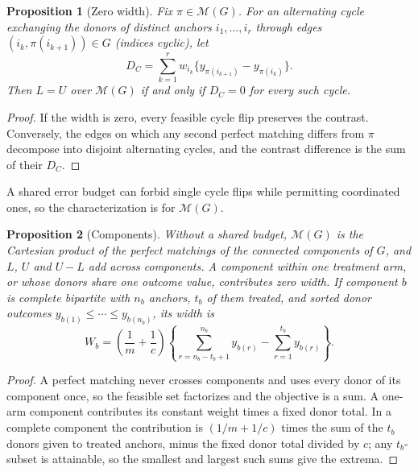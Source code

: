 \documentclass[11pt]{article}
\newtheorem{proposition}{Proposition}
\newcommand{\M}{\mathcal M}
\begin{document}
\begin{proposition}[Zero width]
Fix $\pi\in\M(G)$. For an alternating cycle exchanging the donors of distinct anchors
$i_1,\ldots,i_r$ through edges $(i_k,\pi(i_{k+1}))\in G$ (indices cyclic), let
\[
 D_C=\sum_{k=1}^r w_{i_k}\{y_{\pi(i_{k+1})}-y_{\pi(i_k)}\}.
\]
Then $L=U$ over $\M(G)$ if and only if $D_C=0$ for every such cycle.
\end{proposition}
\begin{proof}
If the width is zero, every feasible cycle flip preserves the contrast. Conversely, the
edges on which any second perfect matching differs from $\pi$ decompose into disjoint
alternating cycles, and the contrast difference is the sum of their $D_C$.
\end{proof}
A shared error budget can forbid single cycle flips while permitting coordinated ones,
so the characterization is for $\M(G)$.

\begin{proposition}[Components]
Without a shared budget, $\M(G)$ is the Cartesian product of the perfect matchings of
the connected components of $G$, and $L$, $U$ and $U-L$ add across components.
A component within one treatment arm, or whose donors share one outcome value,
contributes zero width. If component $b$ is complete bipartite with $n_b$ anchors,
$t_b$ of them treated, and sorted donor outcomes $y_{b(1)}\le\cdots\le y_{b(n_b)}$, its
width is
\[
 W_b=\left(\frac1m+\frac1c\right)\left\{\sum_{r=n_b-t_b+1}^{n_b}y_{b(r)}
 -\sum_{r=1}^{t_b}y_{b(r)}\right\}.
\]
\end{proposition}
\begin{proof}
A perfect matching never crosses components and uses every donor of its component once,
so the feasible set factorizes and the objective is a sum. A one-arm component contributes
its constant weight times a fixed donor total. In a complete component the contribution is
$(1/m+1/c)$ times the sum of the $t_b$ donors given to treated anchors, minus the fixed
donor total divided by $c$; any $t_b$-subset is attainable, so the smallest and largest
such sums give the extrema.
\end{proof}
\end{document}
